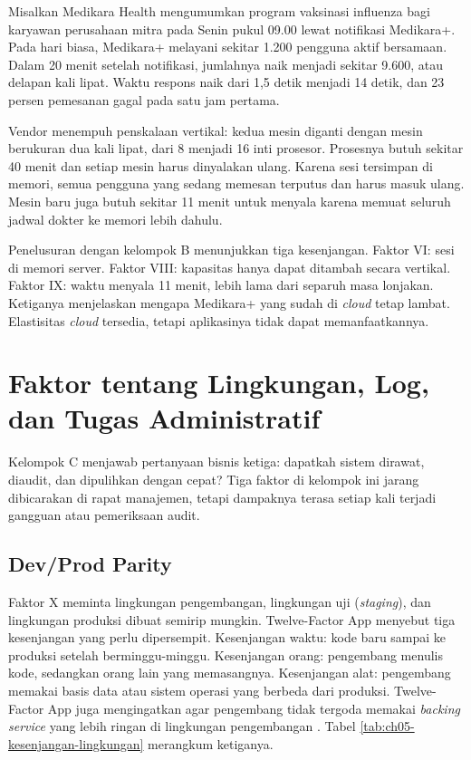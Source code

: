 \begin{kasus}[title={Kasus Medikara Health: Lonjakan Medikara+ saat Program Vaksinasi}]
  Misalkan Medikara Health mengumumkan program vaksinasi influenza bagi karyawan perusahaan
  mitra pada Senin pukul 09.00 lewat notifikasi Medikara+. Pada hari biasa, Medikara+
  melayani sekitar 1.200 pengguna aktif bersamaan. Dalam 20 menit setelah notifikasi,
  jumlahnya naik menjadi sekitar 9.600, atau delapan kali lipat. Waktu respons naik dari 1,5
  detik menjadi 14 detik, dan 23 persen pemesanan gagal pada satu jam pertama.

  Vendor menempuh penskalaan vertikal: kedua mesin diganti dengan mesin berukuran dua kali
  lipat, dari 8 menjadi 16 inti prosesor. Prosesnya butuh sekitar 40 menit dan setiap mesin
  harus dinyalakan ulang. Karena sesi tersimpan di memori, semua pengguna yang sedang
  memesan terputus dan harus masuk ulang. Mesin baru juga butuh sekitar 11 menit untuk
  menyala karena memuat seluruh jadwal dokter ke memori lebih dahulu.

  Penelusuran dengan kelompok B menunjukkan tiga kesenjangan. Faktor VI: sesi di memori
  server. Faktor VIII: kapasitas hanya dapat ditambah secara vertikal. Faktor IX: waktu
  menyala 11 menit, lebih lama dari separuh masa lonjakan. Ketiganya menjelaskan mengapa
  Medikara+ yang sudah di \textit{cloud} tetap lambat. Elastisitas \textit{cloud} tersedia,
  tetapi aplikasinya tidak dapat memanfaatkannya.
\end{kasus}

\section{Faktor tentang Lingkungan, Log, dan Tugas Administratif}
\label{sec:ch05-kelompok-c}

Kelompok C menjawab pertanyaan bisnis ketiga: dapatkah sistem dirawat, diaudit, dan
dipulihkan dengan cepat? Tiga faktor di kelompok ini jarang dibicarakan di rapat manajemen,
tetapi dampaknya terasa setiap kali terjadi gangguan atau pemeriksaan audit.

\subsection{Dev/Prod Parity}

Faktor X meminta lingkungan pengembangan, lingkungan uji (\textit{staging}), dan lingkungan
produksi dibuat semirip mungkin. Twelve-Factor App menyebut tiga kesenjangan yang perlu
dipersempit. Kesenjangan waktu: kode baru sampai ke produksi setelah berminggu-minggu.
Kesenjangan orang: pengembang menulis kode, sedangkan orang lain yang memasangnya.
Kesenjangan alat: pengembang memakai basis data atau sistem operasi yang berbeda dari
produksi. Twelve-Factor App juga mengingatkan agar pengembang tidak tergoda memakai
\textit{backing service} yang lebih ringan di lingkungan pengembangan \cite{twelvefactor}.
Tabel \ref{tab:ch05-kesenjangan-lingkungan} merangkum ketiganya.

